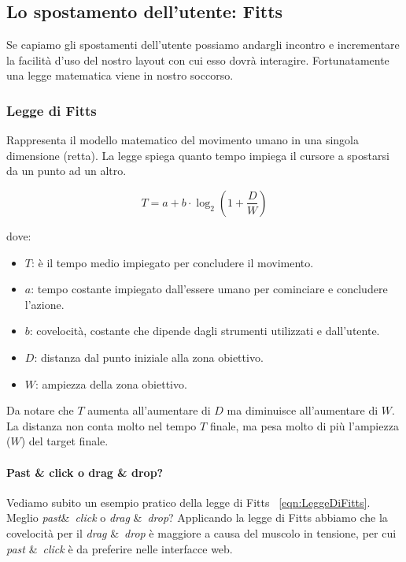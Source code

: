 		\subsection{Lo spostamento dell'utente: Fitts}	
			Se capiamo gli spostamenti dell'utente possiamo andargli incontro e incrementare la facilità d'uso del nostro layout con cui esso dovrà interagire. Fortunatamente una legge matematica viene in nostro soccorso.
		
			\subsubsection{Legge di Fitts}
				Rappresenta il modello matematico del movimento umano in una singola dimensione (retta). La legge spiega quanto tempo impiega il cursore a spostarsi da un punto ad un altro.
			
					\begin{equation}
						\label{eqn:LeggeDiFitts}
						T=a+b \cdot \log_2 (1+\frac{D}{W})
					\end{equation}
					
					dove:
					\begin{itemize}
						\item $T$: è il tempo medio impiegato per concludere il movimento.
						\item $a$: tempo costante impiegato dall'essere umano per cominciare e concludere l'azione.
						\item $b$: covelocità, costante che dipende dagli strumenti utilizzati e dall'utente.
						\item $D$: distanza dal punto iniziale alla zona obiettivo.
						\item $W$: ampiezza della zona obiettivo.
					\end{itemize}
					Da notare che $T$ aumenta all'aumentare di $D$ ma diminuisce all'aumentare di $W$. La distanza non conta molto nel tempo $T$ finale, ma pesa molto di più l'ampiezza ($W$) del target finale.
			
				\paragraph{Past \& click o drag \& drop?}
					Vediamo subito un esempio pratico della legge di Fitts ~\ref{eqn:LeggeDiFitts}. Meglio \emph{past}\&\ \emph{click} o \emph{drag} \&\ \emph{drop}? Applicando la legge di Fitts abbiamo che la covelocità per il \emph{drag} \&\ \emph{drop} è maggiore a causa del muscolo in tensione, per cui \emph{past} \&\ \emph{click} è da preferire nelle interfacce web.
			
